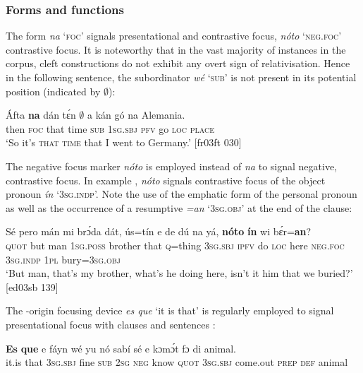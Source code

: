 \subsubsection{Forms and functions}

The form \textit{na} ‘\textsc{foc}’ signals presentational and contrastive focus, \textit{nóto} ‘\textsc{neg}.\textsc{foc}’ contrastive focus. It is noteworthy that in the vast majority of instances in the corpus, cleft constructions do not exhibit any overt sign of relativisation. Hence in the following sentence, the subordinator \textit{wé} ‘\textsc{sub}’ is not present in its potential position (indicated by ${\emptyset}$):


\ea%
    \label{ex:key:690}
    \gll \'{A}fta    \textbf{na}  dán    tɛ́n    ${\emptyset}$  a    kán  gó  na  Alemania.\\
then  \textsc{foc}  that    time    \textsc{sub}  \textsc{1sg.sbj}  \textsc{pfv}  go  \textsc{loc}  \textsc{place}\\

\glt ‘So it’s \textsc{that} \textsc{time} that I went to Germany.’ [fr03ft 030]
\z

The negative focus marker \textit{nóto} is employed instead of \textit{na} to signal negative, contrastive focus. In example , \textit{nóto} signals contrastive focus of the object pronoun \textit{ín} ‘\textsc{3sg.indp}’. Note the use of the emphatic form of the personal pronoun as well as the occurrence of a resumptive \textit{=an} ‘\textsc{3sg.obj}’ at the end of the clause: 


\ea%
    \label{ex:key:691}
    \gll Sé    pero  mán  mi    brɔ́da  dát,    ús=tín  e    de  dú  na  yá,
\textbf{nóto}  \textbf{ín}    wi  bɛ́r=\textbf{an}?\\
\textsc{quot}    but    man  \textsc{1sg.poss}  brother  that    \textsc{q}=thing  \textsc{3sg.sbj}  \textsc{ipfv}  do  \textsc{loc}  here
\textsc{neg}.\textsc{foc}  \textsc{3sg.indp}  \textsc{1pl}  bury=\textsc{3sg.obj}\\

\glt ‘But man, that’s my brother, what’s he doing here, isn’t it him that we 
buried?’ [ed03sb 139]
\z

The -origin focusing device \textit{es que} ‘it is that’ is regularly employed to signal presentational focus with clauses and sentences : 


\ea%
    \label{ex:key:692}
    \gll \textbf{Es}  \textbf{que}   e    fáyn    wé  yu  nó  sabí    sé    e    kɔmɔ́t
fɔ  di  animal.  \\
it.is  that    \textsc{3sg.sbj}  fine    \textsc{sub}  \textsc{2sg}  \textsc{neg}  know  \textsc{quot}    \textsc{3sg.sbj}  come.out
\textsc{prep}  \textsc{def}  animal\\

